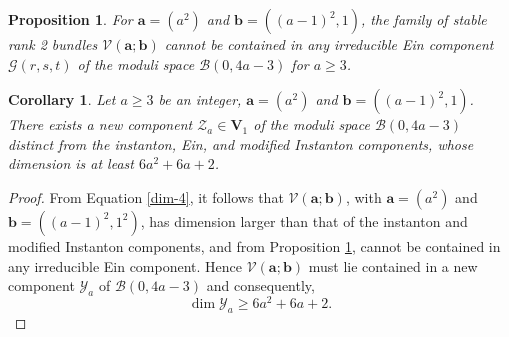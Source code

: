 \documentclass[10pt,a4paper]{amsart}
\newtheorem{proposition}{Proposition}
\newtheorem{corollary}{Corollary}
\begin{document}
\begin{proposition}\label{prop-dim3}
For $\boldsymbol{a}=(a^2)$ and 
$\boldsymbol{b}=({(a-1)}^2,1)$, the family of stable rank 2 bundles $\mathcal{V}(\boldsymbol{a};\boldsymbol{b})$ 
cannot be contained in any irreducible Ein component $\mathcal{G}(r,s,t)$ of the moduli 
space $\mathcal{B}(0,4a-3)$ for $a\geq3$.
 \end{proposition}

\begin{corollary}\label{family-2}
Let $a\geq3$ be an integer, $\boldsymbol{a}=(a^2)$ and 
$\boldsymbol{b}=({(a-1)}^2,1)$. There exists a new component $\mathcal{Z}_a\in\mathbf{V}_1$ of the moduli space 
$\mathcal{B}(0,4a-3)$ distinct 
from the instanton, Ein, and modified Instanton components, whose dimension is at least $6a^2+6a+2$.
\end{corollary}

\begin{proof}
From Equation \eqref{dim-4}, it follows that 
$\mathcal{V}(\boldsymbol{a};\boldsymbol{b})$, with $\boldsymbol{a}=(a^2)$ and $\boldsymbol{b}=({(a-1)}^2,1^2)$, has 
dimension larger than that of the instanton and modified Instanton components, and from Proposition \ref{prop-dim3}, cannot be contained in any irreducible Ein component. Hence 
$\mathcal{V}(\boldsymbol{a};\boldsymbol{b})$ must lie contained in a new component $\mathcal{Y}_a$ 
of $\mathcal{B}(0,4a-3)$ and consequently,
$$\dim \mathcal{Y}_a\geq 6a^2+6a+2.$$
\end{proof}
\end{document}
